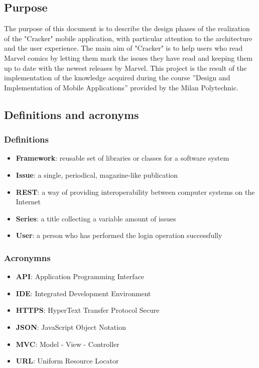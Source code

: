 \subsection{Purpose}
The purpose of this document is to describe the design phases of the realization of the "Cracker" mobile application, with particular attention to the architecture and the user experience. \newline
The main aim of "Cracker" is to help users who read Marvel comics by letting them mark the issues they have read and keeping them up to date with the newest releases by Marvel. \newline
This project is the result of the implementation of the knowledge acquired during the course ”Design and Implementation of Mobile Applications” provided by the Milan Polytechnic.


\subsection{Definitions and acronyms}
\subsubsection{Definitions}
\begin{itemize}
\item {\textbf{Framework}}: reusable set of libraries or classes for a software system
\item {\textbf{Issue}}: a single, periodical, magazine-like publication
\item {\textbf{REST}}: a way of providing interoperability between computer systems on the Internet
\item {\textbf{Series}}: a title collecting a variable amount of issues
\item {\textbf{User}}: a person who has performed the login operation successfully
\end{itemize}

\subsubsection{Acronymns}
\begin{itemize}
\item {\textbf{API}}: Application Programming Interface
\item {\textbf{IDE}}: Integrated Development Environment
\item {\textbf{HTTPS}}: HyperText Transfer Protocol Secure
\item {\textbf{JSON}}: JavaScript Object Notation
\item {\textbf{MVC}}: Model - View - Controller
\item {\textbf{URL}}: Uniform Resource Locator
\end{itemize}


